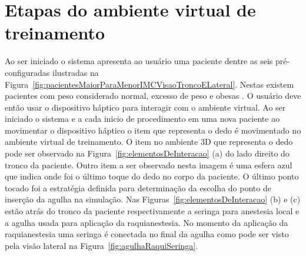 
\section {Etapas do ambiente virtual de treinamento}

Ao ser iniciado o sistema apresenta ao usuário uma paciente dentre as seis pré-configuradas ilustradas na Figura~\ref{fig:pacientesMaiorParaMenorIMCVisaoTroncoELateral}. Nestas existem pacientes com peso considerado normal, excesso de peso e obesas \cite{MTILLC2019}. O usuário deve então usar o dispositivo háptico para interagir com o ambiente virtual. Ao ser iniciado o sistema e a cada inicio de procedimento em uma nova paciente ao movimentar o dispositivo háptico o item que representa o dedo é movimentado no ambiente virtual de treinamento. O item no ambiente 3D que representa o dedo pode ser observado na Figura~\ref{fig:elementosDeInteracao} (a) do lado direito do tronco da paciente. Outro item a ser observado nesta imagem é uma esfera azul que indica onde foi o último toque do dedo no corpo da paciente. O último ponto tocado foi a estratégia definida para determinação da escolha do ponto de inserção da agulha na simulação. Nas Figuras~\ref{fig:elementosDeInteracao} (b) e (c) estão atrás do tronco da paciente respectivamente a seringa para anestesia local e a agulha usada para aplicação da raquianestesia. No momento da aplicação da raquianestesia uma seringa é conectada no final da agulha como pode ser visto pela visão lateral na Figura~\ref{fig:agulhaRaquiSeringa}.

